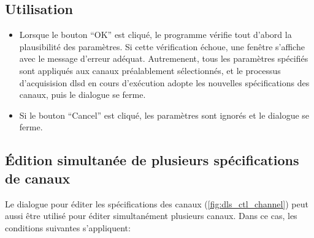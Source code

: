 \documentclass[a4paper,12pt,BCOR6mm,bibtotoc,idxtotoc]{scrbook}
\begin{document}

\subsection{Utilisation}

\begin{itemize}

\item Lorsque le bouton ``OK'' est cliqu\'e, le programme v\'erifie
  tout d'abord la plausibilit\'e des param\`etres.  Si cette
  v\'erification \'echoue, une fen\^etre s'affiche avec le message
  d'erreur ad\'equat.  Autremenent, tous les param\`etres
  sp\'ecifi\'es sont appliqu\'es aux canaux pr\'ealablement
  s\'electionn\'es, et le processus d'acquisision dlsd en cours
  d'ex\'ecution adopte les nouvelles sp\'ecifications des canaux,
  puis le dialogue se ferme.

\item Si le bouton ``Cancel'' est cliqu\'e, les param\`etres sont
  ignor\'es et le dialogue se ferme.

\end{itemize}


\subsection{\'Edition simultan\'ee de plusieurs sp\'ecifications de canaux}

\label{sec:manager_channels_edit_parallel}

Le dialogue pour \'editer les sp\'ecifications des canaux
(\autoref{fig:dls_ctl_channel}) peut aussi \^etre utilis\'e pour
\'editer simultan\'ement plusieurs canaux. Dans ce cas, les
conditions suivantes s'appliquent:
\end{document}
